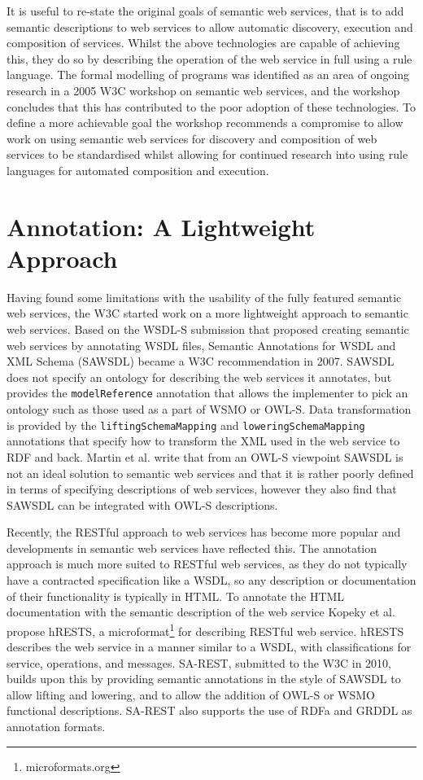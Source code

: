 It is useful to re-state the original goals of semantic web services, that is to add
semantic descriptions to web services to allow automatic discovery, execution
and composition of services. Whilst the above technologies are capable of
achieving this, they do so by describing the operation of the web service in
full using a rule language. The formal modelling of programs was identified as an area of
ongoing research in a 2005 W3C workshop on semantic web services, and the
workshop concludes that this has contributed to the poor adoption of these 
technologies\cite{battle_report_????}. To define a more achievable goal 
the workshop recommends a compromise to
allow work on using semantic web services for discovery and composition of web
services to be standardised whilst allowing for continued research into using
rule languages for automated composition and execution.

\section{Annotation: A Lightweight Approach}

Having found some limitations with the usability of the fully featured semantic
web services, the W3C
started work on a more lightweight approach to semantic web services. Based on
the WSDL-S submission that proposed creating semantic web services by annotating
WSDL files, Semantic Annotations for WSDL and XML Schema (SAWSDL) became a W3C
recommendation in 2007. SAWSDL does not specify an ontology for describing the
web services it annotates, but provides the \verb=modelReference= annotation that allows the
implementer to pick an ontology such as those used as a part of  WSMO or OWL-S.
Data transformation is
provided by the \verb=liftingSchemaMapping= and \verb=loweringSchemaMapping=
annotations that specify how to transform the XML used in the web service to
RDF and back. Martin et al. write that from an OWL-S viewpoint SAWSDL is not an
ideal solution to semantic web services and that it is rather poorly defined
in terms of specifying descriptions of web services, however they also find that
SAWSDL can be integrated with OWL-S descriptions\cite{martin_bringing_2007}.

Recently, the RESTful approach to web services has become more popular and
developments in semantic web services have reflected this. The annotation
approach is much more suited to RESTful web services, as they do not typically
have a contracted specification like a WSDL, so any description or documentation
of their functionality is typically in HTML\cite{kopecky_hrests:_2008}. To
annotate the HTML documentation with the semantic description of the web
service Kopeky et al. propose hRESTS, a
microformat\footnote[1]{microformats.org} for describing RESTful web service\cite{kopecky_hrests:_2008}.
hRESTS describes the web service in a manner similar to a WSDL, with
classifications for service, operations, and messages. 
SA-REST, submitted to the W3C in 2010, builds upon this by providing semantic
annotations in the style of SAWSDL to allow lifting and lowering, and to allow
the addition of OWL-S or WSMO functional descriptions\cite{lathem_sa-rest_2007}.
SA-REST also supports the use of RDFa and GRDDL as annotation
formats\cite{sheth_semantics_2008}.

